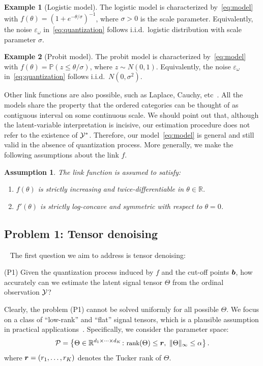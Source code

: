 \documentclass{article}
\theoremstyle{plain}
\newtheorem{assumption}{Assumption}
\theoremstyle{definition}
\newtheorem{example}{Example}
\begin{document}
\begin{example}[Logistic model] The logistic model is characterized by~\eqref{eq:model} with $f(\theta)=(1+e^{-\theta/\sigma})^{-1}$, where $\sigma>0$ is the scale parameter. Equivalently, the noise $\varepsilon_\omega$ in~\eqref{eq:quantization} follows i.i.d.\ logistic distribution with scale parameter $\sigma$.
\end{example}
\begin{example}[Probit model] The probit model is characterized by~\eqref{eq:model} with
$f(\theta)=\mathbb{P}(z\leq \theta/\sigma)$, where $z\sim N(0,1)$. Equivalently, the noise $\varepsilon_\omega$ in~\eqref{eq:quantization} follows i.i.d.\ $N(0,\sigma^2)$.
\end{example}
Other link functions are also possible, such as Laplace, Cauchy, etc~\cite{mccullagh1980regression}. All the models share the property that the ordered categories can be thought of as contiguous interval on some continuous scale. We should point out that, although the latent-variable interpretation is incisive, our estimation procedure does not refer to the existence of $\mathcal{Y}^*$. Therefore, our model~\eqref{eq:model} is general and still valid in the absence of quantization process. More generally, we make the following assumptions about the link $f$.

\begin{assumption}\label{ass:link}
The link function is assumed to satisfy:
\vspace{-.2cm}
\begin{enumerate}
\item $f(\theta)$ is strictly increasing and twice-differentiable in $\theta\in \mathbb{R}$.
\item $f'(\theta)$ is strictly log-concave and symmetric with respect to $\theta=0$.
\end{enumerate}
\end{assumption}

\subsection{Problem 1: Tensor denoising}~\label{sec:denoising}
The first question we aim to address is tensor denoising:

(P1) Given the quantization process induced by $f$ and the cut-off points $\bm{b}$, how accurately can we estimate the latent signal tensor $\Theta$ from the ordinal observation $\mathcal{Y}$?

Clearly, the problem (P1) cannot be solved uniformly for all possible $\Theta$. We focus on a class of ``low-rank'' and ``flat'' signal tensors, which is a plausible assumption in practical applications~\cite{zhou2013tensor,bhaskar20151}. Specifically, we consider the parameter space:
\begin{equation}\label{eq:space}
\small \tP=\left\{\Theta\in\mathbb{R}^{d_1\times \cdots \times d_K} \colon \text{rank}(\Theta)\leq \mr,\ \mnormSize{}{\Theta}\leq \alpha\right\}.
\end{equation}
where $\bm{r}=(r_1,\ldots,r_K)$ denotes the Tucker rank of $\Theta$.
\end{document}
